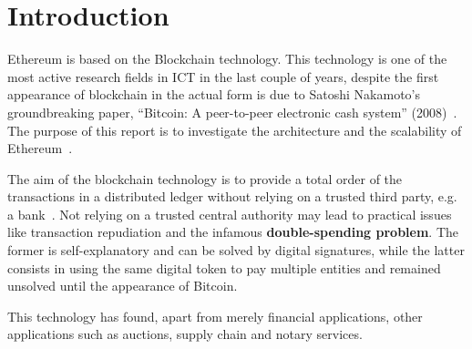 \section*{Introduction}

Ethereum is based on the Blockchain technology. This technology is one of the
most active research fields in ICT in the last couple of years, despite the
first appearance of blockchain in the actual form is due to Satoshi Nakamoto's
groundbreaking paper, ``Bitcoin: A peer-to-peer electronic cash system''
(2008)~\cite{bib:bitcoin}. The purpose of this report is to investigate the
architecture and the scalability of Ethereum~\cite{wood2018ethereum}.

The aim of the blockchain technology is to provide a total order of the
transactions in a distributed ledger without relying on a trusted third party,
e.g. a bank~\cite{bib:the-quest}. Not relying on a trusted central authority may
lead to practical issues like transaction repudiation and the infamous
\textbf{double-spending problem}. The former is self-explanatory and can be
solved by digital signatures, while the latter consists in using the same
digital token to pay multiple entities and remained unsolved until the
appearance of Bitcoin.

This technology has found, apart from merely financial applications, other
applications such as auctions, supply chain and notary services.

